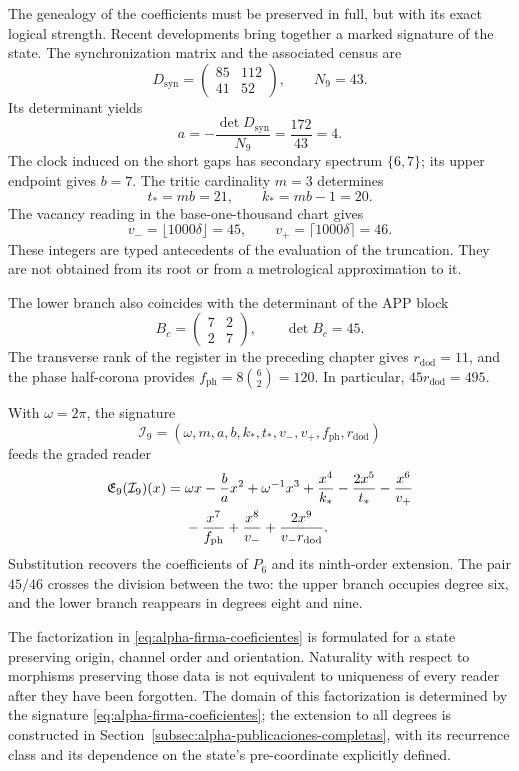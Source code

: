 The genealogy of the coefficients must be preserved in full, but with its
exact logical strength. Recent developments bring together a marked signature
of the state. The synchronization matrix and the associated census are
\[
 D_{\mathrm{syn}}=\begin{pmatrix}85&112\\41&52\end{pmatrix},
 \qquad N_9=43.
\]
Its determinant yields
\[
 a=-\frac{\det D_{\mathrm{syn}}}{N_9}
   =\frac{172}{43}=4.
\]
The clock induced on the short gaps has secondary spectrum
\(\{6,7\}\); its upper endpoint gives \(b=7\). The tritic
cardinality \(m=3\) determines
\[
 t_*=mb=21,\qquad k_*=mb-1=20.
\]
The vacancy reading in the base-one-thousand chart gives
\[
 v_-=\lfloor1000\delta\rfloor=45,\qquad
 v_+=\lceil1000\delta\rceil=46.
\]
These integers are typed antecedents of the evaluation of the truncation. They are not
obtained from its root or from a metrological approximation to it.

The lower branch also coincides with the determinant of the APP block
\[
 B_c=\begin{pmatrix}7&2\\2&7\end{pmatrix},\qquad\det B_c=45.
\]
The transverse rank of the register in the preceding chapter gives
\(r_{\mathrm{dod}}=11\), and the phase half-corona provides
\(f_{\mathrm{ph}}=8\binom62=120\). In particular,
\(45r_{\mathrm{dod}}=495\).

With \(\omega=2\pi\), the signature
\[
 \mathcal I_9=(\omega,m,a,b,k_*,t_*,v_-,v_+,f_{\mathrm{ph}},r_{\mathrm{dod}})
\]
feeds the graded reader
\begin{align}
 \mathfrak E_9(\mathcal I_9)(x)
 ={}&\omega x-\frac ba x^2+\omega^{-1}x^3
 +\frac{x^4}{k_*}-\frac{2x^5}{t_*}-\frac{x^6}{v_+}\notag\\
 &-\frac{x^7}{f_{\mathrm{ph}}}+\frac{x^8}{v_-}
 +\frac{2x^9}{v_-r_{\mathrm{dod}}}.
 \label{eq:alpha-firma-coeficientes}
\end{align}
Substitution recovers the coefficients of \(P_6\) and its
ninth-order extension. The pair \(45/46\) crosses the division
between the two: the upper branch occupies degree six, and the lower branch reappears
in degrees eight and nine.

The factorization in \eqref{eq:alpha-firma-coeficientes} is formulated
for a state preserving origin, channel order and orientation.
Naturality with respect to morphisms preserving those data is not equivalent to
uniqueness of every reader after they have been forgotten. The domain of this
factorization is determined by the signature
\eqref{eq:alpha-firma-coeficientes}; the extension to all degrees
is constructed in Section~\ref{subsec:alpha-publicaciones-completas},
with its recurrence class and its dependence on the state's pre-coordinate
explicitly defined.


